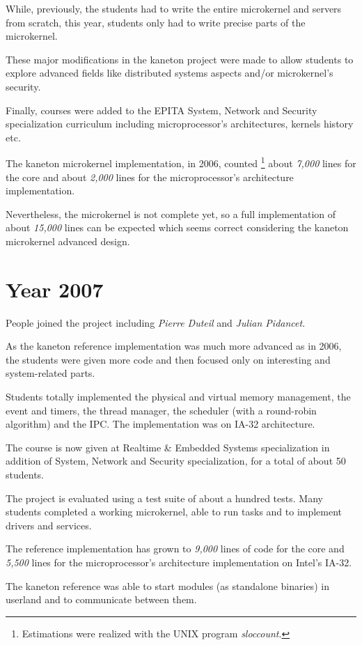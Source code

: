 While, previously, the students had to write the entire microkernel
and servers from scratch, this year, students only had to write precise
parts of the microkernel.

These major modifications in the kaneton project were made to
allow students to explore advanced fields like distributed systems
aspects and/or microkernel's security.

Finally, courses were added to the EPITA System, Network and Security
specialization curriculum including microprocessor's architectures,
kernels history etc.

The kaneton microkernel implementation, in 2006, counted
\footnote{Estimations were realized with the UNIX program \textit{sloccount}.}
about \textit{7,000} lines for the core and about \textit{2,000} lines for the
microprocessor's architecture implementation.

Nevertheless, the microkernel is not complete yet, so a full implementation
of about \textit{15,000} lines can be expected which seems correct
considering the kaneton microkernel advanced design.

%
%

\section{Year 2007}

People joined the project including \textit{Pierre Duteil} and
\textit{Julian Pidancet}.

As the kaneton reference implementation was much more advanced as in
2006, the students were given more code and then focused only on
interesting and system-related parts.

Students totally implemented the physical and virtual memory
management, the event and timers, the thread manager, the scheduler
(with a round-robin algorithm) and the IPC. The implementation was on
IA-32 architecture.

The course is now given at Realtime \& Embedded Systems specialization
in addition of System, Network and Security specialization, for a
total of about 50 students.

The project is evaluated using a test suite of about a hundred
tests. Many students completed a working microkernel, able to run tasks
and to implement drivers and services.

The reference implementation has grown to \textit{9,000}
lines of code for the core and \textit{5,500} lines for the
microprocessor's architecture implementation on Intel's IA-32.

The kaneton reference was able to start modules (as standalone
binaries) in userland and to communicate between them.
